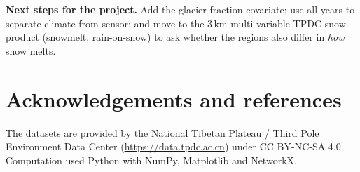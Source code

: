 \documentclass[11pt]{article}
\begin{document}
\textbf{Next steps for the project.} Add the glacier-fraction covariate; use all years to
separate climate from sensor; and move to the 3\,km multi-variable TPDC snow product
(snowmelt, rain-on-snow) to ask whether the regions also differ in \emph{how} snow melts.

\section*{Acknowledgements and references}

The datasets are provided by the National Tibetan Plateau / Third Pole Environment Data
Center (\url{https://data.tpdc.ac.cn}) under CC BY-NC-SA 4.0. Computation used Python
with NumPy, Matplotlib and NetworkX.
\end{document}
